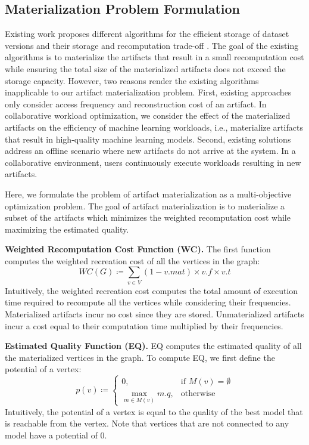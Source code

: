 \subsection{Materialization Problem Formulation}\label{subsec-materialization-problem}
Existing work proposes different algorithms for the efficient storage of dataset versions and their storage and recomputation trade-off \cite{bhattacherjee2015principles}.
The goal of the existing algorithms is to materialize the artifacts that result in a small recomputation cost while ensuring the total size of the materialized artifacts does not exceed the storage capacity.
However, two reasons render the existing algorithms inapplicable to our artifact materialization problem.
First, existing approaches only consider access frequency and reconstruction cost of an artifact.
In collaborative workload optimization, we consider the effect of the materialized artifacts on the efficiency of machine learning workloads, i.e., materialize artifacts that result in high-quality machine learning models.
Second, existing solutions address an offline scenario where new artifacts do not arrive at the system.
In a collaborative environment, users continuously execute workloads resulting in new artifacts.

Here, we formulate the problem of artifact materialization as a multi-objective optimization problem.
The goal of artifact materialization is to materialize a subset of the artifacts which minimizes the weighted recomputation cost while maximizing the estimated quality.

\textbf{Weighted Recomputation Cost Function (WC).} 
The first function computes the weighted recreation cost of all the vertices in the graph:
\[
WC(G) \coloneqq  \sum\limits_{v \in V}  (1-v.mat) \times v.f \times v.t
\]
Intuitively, the weighted recreation cost computes the total amount of execution time required to recompute all the vertices while considering their frequencies.
Materialized artifacts incur no cost since they are stored.
Unmaterialized artifacts incur a cost equal to their computation time multiplied by their frequencies.

\textbf{Estimated Quality Function (EQ).} 
EQ computes the estimated quality of all the materialized vertices in the graph.
To compute EQ, we first define the potential of a vertex:
\[
p(v) \coloneqq  
		\begin{cases}
		0 , & \text{if }M(v) = \emptyset  \\
		\max\limits_{m \in M(v)} m.q, & \text{otherwise}
		\end{cases}
\]
Intuitively, the potential of a vertex is equal to the quality of the best model that is reachable from the vertex.
Note that vertices that are not connected to any model have a potential of 0.

